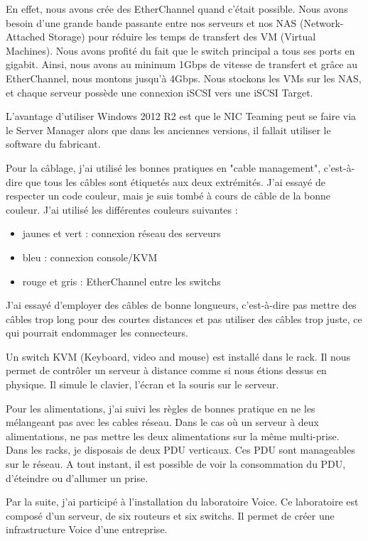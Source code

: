 En effet, nous avons crée des EtherChannel quand c'était possible. 
Nous avons besoin d'une grande bande passante entre nos serveurs et nos NAS (Network-Attached Storage) pour réduire les temps de transfert des VM (Virtual Machines).
Nous avons profité du fait que le switch principal a tous ses ports en gigabit. 
Ainsi, nous avons au minimum 1Gbps de vitesse de transfert et grâce au EtherChannel, nous montons jusqu'à 4Gbps.
Nous stockons les VMs sur les NAS, et chaque serveur possède une connexion iSCSI vers une iSCSI Target. 

L'avantage d'utiliser Windows 2012 R2 est que le NIC Teaming peut se faire via le Server Manager alors que dans les anciennes versions, il fallait utiliser le software du fabricant.

Pour la câblage, j'ai utilisé les bonnes pratiques en "cable management", c'est-à-dire que tous les câbles sont étiquetés aux deux extrémités.
J'ai essayé de respecter un code couleur, mais je suis tombé à cours de câble de la bonne couleur.
J'ai utilisé les différentes couleurs suivantes :
\begin{itemize}
	\item jaunes et vert : connexion réseau des serveurs
	\item bleu : connexion console/KVM
	\item rouge et gris : EtherChannel entre les switchs
\end{itemize}
J'ai essayé d'employer des câbles de bonne longueurs, c'est-à-dire pas mettre des câbles trop long pour des courtes distances et pas utiliser des câbles trop juste, ce qui pourrait endommager les connecteurs.

Un switch KVM (Keyboard, video and mouse) est installé dans le rack.
Il nous permet de contrôler un serveur à distance comme si nous étions dessus en physique.
Il simule le clavier, l'écran et la souris sur le serveur. 

Pour les alimentations, j'ai suivi les règles de bonnes pratique en ne les mélangeant pas avec les cables réseau.
Dans le cas où un serveur à deux alimentations, ne pas mettre les deux alimentations sur la même multi-prise.
Dans les racks, je disposais de deux PDU verticaux. 
Ces PDU sont manageables sur le réseau. 
A tout instant, il est possible de voir la consommation du PDU, d'éteindre ou d'allumer un prise.

Par la suite, j'ai participé à l'installation du laboratoire Voice.
Ce laboratoire est composé d'un serveur, de six routeurs et six switchs.
Il permet de créer une infrastructure Voice d'une entreprise.

